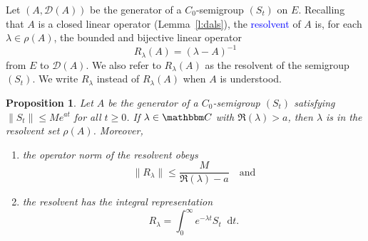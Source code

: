 \documentclass[12pt, reqno]{amsart}
\renewcommand{\leq}{\leqslant}
\renewcommand{\geq}{\geqslant}
\newcommand{\1}{\mathbbm 1}
\newcommand*\diff{\mathop{}\!\mathrm{d}}
\newcommand{\dD}{\mathcal D}
\newcommand{\CC}{\mathbbm C}
\theoremstyle{plain}
\newtheorem{proposition}[theorem]{Proposition}
\theoremstyle{definition}
\newcommand{\navy}[1]{\textcolor{blue}{#1}}
\begin{document}
Let $(A, \dD(A))$ be the generator of a $C_0$-semigroup $(S_t)$ on $E$.
Recalling that $A$ is a closed linear operator (Lemma~\ref{l:dals}), the
\navy{resolvent} of $A$ is, for each $\lambda\in\rho(A)$, the bounded and
bijective linear operator
%
\begin{equation*}
   R_{\lambda}(A)=(\lambda - A)^{-1} 
\end{equation*}
%
from $E$ to $\dD(A)$.  We also refer to $R_\lambda(A)$ as the resolvent of the
semigroup $(S_t)$.  We write $R_\lambda$ instead of $R_\lambda(A)$ when $A$ is
understood.

\begin{proposition} 
    Let $A$ be the generator of a $C_0$-semigroup $(S_t)$
    satisfying $\| S_t\|\leq M e^{at}$ for all $t\geq 0$.  
    If $\lambda\in \CC$ with $\Re(\lambda)>a$, then 
    $\lambda$ is in the resolvent set $\rho(A)$.  Moreover,
	\begin{enumerate}
		\item the operator norm of the resolvent obeys 
            \begin{equation*}
                \|R_{\lambda}\|\leq\frac{M}{\Re(\lambda)-a}
                \quad \text{and}
            \end{equation*}
		\item the resolvent has the integral representation
            \begin{equation*}
                R_{\lambda}
                = \int_{0}^{\infty} e^{-\lambda t}S_t \diff t.
            \end{equation*}
	\end{enumerate}
\end{proposition}
\end{document}
